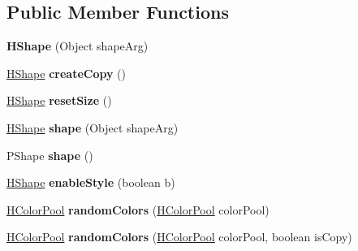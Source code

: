 \subsection*{Public Member Functions}
\begin{DoxyCompactItemize}
\item 
\hypertarget{classhype_1_1drawable_1_1_h_shape_a53f04e8c4012ccb8577b1877637cd878}{{\bfseries H\-Shape} (Object shape\-Arg)}\label{classhype_1_1drawable_1_1_h_shape_a53f04e8c4012ccb8577b1877637cd878}

\item 
\hypertarget{classhype_1_1drawable_1_1_h_shape_a3c87e6bdac6bbfeced9d25bfac8527b3}{\hyperlink{classhype_1_1drawable_1_1_h_shape}{H\-Shape} {\bfseries create\-Copy} ()}\label{classhype_1_1drawable_1_1_h_shape_a3c87e6bdac6bbfeced9d25bfac8527b3}

\item 
\hypertarget{classhype_1_1drawable_1_1_h_shape_a7b53aa8764021e6036540ceb0750541c}{\hyperlink{classhype_1_1drawable_1_1_h_shape}{H\-Shape} {\bfseries reset\-Size} ()}\label{classhype_1_1drawable_1_1_h_shape_a7b53aa8764021e6036540ceb0750541c}

\item 
\hypertarget{classhype_1_1drawable_1_1_h_shape_ae495de06427f5e8349fb3bd0274f6c29}{\hyperlink{classhype_1_1drawable_1_1_h_shape}{H\-Shape} {\bfseries shape} (Object shape\-Arg)}\label{classhype_1_1drawable_1_1_h_shape_ae495de06427f5e8349fb3bd0274f6c29}

\item 
\hypertarget{classhype_1_1drawable_1_1_h_shape_a2df9d3cd17b1a313c9967ba38178883f}{P\-Shape {\bfseries shape} ()}\label{classhype_1_1drawable_1_1_h_shape_a2df9d3cd17b1a313c9967ba38178883f}

\item 
\hypertarget{classhype_1_1drawable_1_1_h_shape_a9495563e316f5aaf8faa2dee58197e0a}{\hyperlink{classhype_1_1drawable_1_1_h_shape}{H\-Shape} {\bfseries enable\-Style} (boolean b)}\label{classhype_1_1drawable_1_1_h_shape_a9495563e316f5aaf8faa2dee58197e0a}

\item 
\hypertarget{classhype_1_1drawable_1_1_h_shape_afee75e474f4326fef8ede905140e69e9}{\hyperlink{classhype_1_1colorist_1_1_h_color_pool}{H\-Color\-Pool} {\bfseries random\-Colors} (\hyperlink{classhype_1_1colorist_1_1_h_color_pool}{H\-Color\-Pool} color\-Pool)}\label{classhype_1_1drawable_1_1_h_shape_afee75e474f4326fef8ede905140e69e9}

\item 
\hypertarget{classhype_1_1drawable_1_1_h_shape_a4667cf9bc56e6086abd938c61a6cc060}{\hyperlink{classhype_1_1colorist_1_1_h_color_pool}{H\-Color\-Pool} {\bfseries random\-Colors} (\hyperlink{classhype_1_1colorist_1_1_h_color_pool}{H\-Color\-Pool} color\-Pool, boolean is\-Copy)}\label{classhype_1_1drawable_1_1_h_shape_a4667cf9bc56e6086abd938c61a6cc060}


\end{DoxyCompactItemize}
